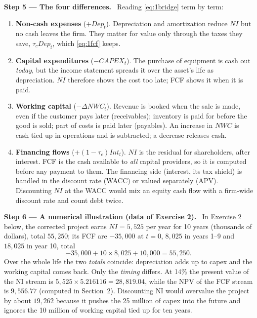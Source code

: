 \documentclass[11pt,a4paper]{article}
\numberwithin{equation}{section}
\newcommand{\step}[2]{\par\medskip\noindent\textbf{Step #1 --- #2.}~}
\begin{document}
\step{5}{The four differences} Reading \eqref{eq:1bridge} term by term:
\begin{enumerate}[label=(\roman*),leftmargin=2em]
  \item \textbf{Non-cash expenses} ($+Dep_t$). Depreciation and amortization reduce $NI$ but no
        cash leaves the firm. They matter for value only through the taxes they save,
        $\tau_c Dep_t$, which \eqref{eq:1fcf} keeps.
  \item \textbf{Capital expenditures} ($-CAPEX_t$). The purchase of equipment is cash out
        \emph{today}, but the income statement spreads it over the asset's life as depreciation.
        $NI$ therefore shows the cost too late; FCF shows it when it is paid.
  \item \textbf{Working capital} ($-\Delta NWC_t$). Revenue is booked when the sale is made, even if
        the customer pays later (receivables); inventory is paid for before the good is sold; part
        of costs is paid later (payables). An increase in $NWC$ is cash tied up in operations
        and is subtracted; a decrease releases cash.
  \item \textbf{Financing flows} ($+(1-\tau_c)Int_t$). $NI$ is the residual for shareholders,
        after interest. FCF is the cash available to \emph{all} capital providers, so it is
        computed before any payment to them. The financing side (interest, its tax shield) is
        handled in the discount rate (WACC) or valued separately (APV). Discounting $NI$ at the
        WACC would mix an equity cash flow with a firm-wide discount rate and count debt twice.
\end{enumerate}

\step{6}{A numerical illustration (data of Exercise 2)} In Exercise 2 below, the corrected project
earns $NI = 5{,}525$ per year for 10 years (thousands of dollars), total $55{,}250$; its FCF are
$-35{,}000$ at $t=0$, $8{,}025$ in years 1--9 and $18{,}025$ in year 10, total
\begin{equation}\label{eq:1sum}
  -35{,}000 + 10\times 8{,}025 + 10{,}000 = 55{,}250 .
\end{equation}
Over the whole life the two \emph{totals} coincide: depreciation adds up to capex and the working
capital comes back. Only the \emph{timing} differs. At 14\% the present value of the NI stream is
$5{,}525\times 5.216116 = 28{,}819.04$, while the NPV of the FCF stream is $9{,}556.77$ (computed
in Section~2). Discounting NI would overvalue the project by about $19{,}262$ because it pushes the
25 million of capex into the future and ignores the 10 million of working capital tied up for ten
years.
\end{document}
